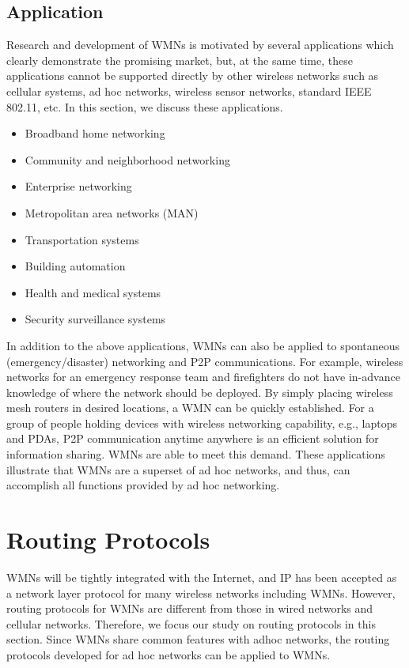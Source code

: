 \documentclass[12pt,a4paper]{report}
\begin{document}

\subsection{Application}
Research and development of WMNs is motivated by several applications which clearly
demonstrate the promising market, but, at the same time, these applications cannot be
supported directly by other wireless networks such as cellular systems, ad hoc networks,
wireless sensor networks, standard IEEE 802.11, etc. In this section, we discuss these
applications.
\begin{itemize}
\item Broadband home networking
\item Community and neighborhood networking
\item Enterprise networking
\item Metropolitan area networks (MAN)
\item Transportation systems
\item Building automation
\item Health and medical systems
\item Security surveillance systems
\end{itemize}
In addition to the above applications, WMNs can also be applied to spontaneous
(emergency/disaster) networking and P2P communications. For example, wireless networks
for an emergency response team and firefighters do not have in-advance knowledge of
where the network should be deployed. By simply placing wireless mesh routers in
desired locations, a WMN can be quickly established.
For a group of people holding
devices with wireless networking capability, e.g., laptops and PDAs, P2P communication
anytime anywhere is an efficient solution for information sharing. WMNs are able to meet this demand. These applications illustrate that WMNs are a superset of ad hoc networks, and
thus, can accomplish all functions provided by ad hoc networking.

\section{Routing Protocols}
WMNs will be tightly integrated with the Internet, and IP has been accepted as a network layer protocol for many wireless networks including WMNs. However, routing protocols for WMNs are different from those in wired networks and cellular networks. Therefore, we focus our study on routing protocols in this section.
Since WMNs share common features with adhoc networks, the routing protocols developed for ad hoc networks can be applied to WMNs.
\end{document}

